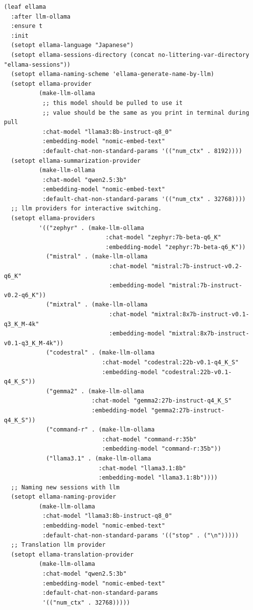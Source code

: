 \documentclass[11pt]{article}
\begin{document}
\begin{verbatim}
(leaf ellama
  :after llm-ollama
  :ensure t
  :init
  (setopt ellama-language "Japanese")
  (setopt ellama-sessions-directory (concat no-littering-var-directory "ellama-sessions"))
  (setopt ellama-naming-scheme 'ellama-generate-name-by-llm)
  (setopt ellama-provider
          (make-llm-ollama
           ;; this model should be pulled to use it
           ;; value should be the same as you print in terminal during pull
           :chat-model "llama3:8b-instruct-q8_0"
           :embedding-model "nomic-embed-text"
           :default-chat-non-standard-params '(("num_ctx" . 8192))))
  (setopt ellama-summarization-provider
          (make-llm-ollama
           :chat-model "qwen2.5:3b"
           :embedding-model "nomic-embed-text"
           :default-chat-non-standard-params '(("num_ctx" . 32768))))
  ;; llm providers for interactive switching.
  (setopt ellama-providers
          '(("zephyr" . (make-llm-ollama
                             :chat-model "zephyr:7b-beta-q6_K"
                             :embedding-model "zephyr:7b-beta-q6_K"))
            ("mistral" . (make-llm-ollama
                              :chat-model "mistral:7b-instruct-v0.2-q6_K"
                              :embedding-model "mistral:7b-instruct-v0.2-q6_K"))
            ("mixtral" . (make-llm-ollama
                              :chat-model "mixtral:8x7b-instruct-v0.1-q3_K_M-4k"
                              :embedding-model "mixtral:8x7b-instruct-v0.1-q3_K_M-4k"))
            ("codestral" . (make-llm-ollama
                            :chat-model "codestral:22b-v0.1-q4_K_S"
                            :embedding-model "codestral:22b-v0.1-q4_K_S"))
            ("gemma2" . (make-llm-ollama
                         :chat-model "gemma2:27b-instruct-q4_K_S"
                         :embedding-model "gemma2:27b-instruct-q4_K_S"))
            ("command-r" . (make-llm-ollama
                            :chat-model "command-r:35b"
                            :embedding-model "command-r:35b"))
            ("llama3.1" . (make-llm-ollama
                           :chat-model "llama3.1:8b"
                           :embedding-model "llama3.1:8b"))))
  ;; Naming new sessions with llm
  (setopt ellama-naming-provider
          (make-llm-ollama
           :chat-model "llama3:8b-instruct-q8_0"
           :embedding-model "nomic-embed-text"
           :default-chat-non-standard-params '(("stop" . ("\n")))))
  ;; Translation llm provider
  (setopt ellama-translation-provider
          (make-llm-ollama
           :chat-model "qwen2.5:3b"
           :embedding-model "nomic-embed-text"
           :default-chat-non-standard-params
           '(("num_ctx" . 32768)))))
\end{verbatim}
\end{document}
